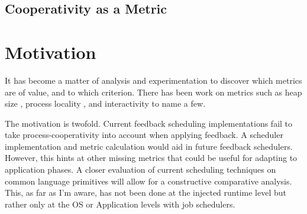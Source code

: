 
\subsection{Cooperativity as a Metric}







\section{Motivation}


It has become a matter of analysis and experimentation to discover which metrics are of value, and to which criterion.
There has been work on metrics such as heap size \cite{white2012automated}, process locality 
\cite{debattista2002cache,ritson2012multicore}, and interactivity \cite{reppy1993concurrent} to name a few.

The motivation is twofold. Current feedback scheduling implementations fail to take process-cooperativity
into account when applying feedback. A scheduler implementation and metric calculation would aid in future
feedback schedulers. However, this hints at other missing metrics that could be useful for adapting to
application phases. A closer evaluation of current scheduling techniques on common language primitives
will allow for a constructive comparative analysis. This, as far as I'm aware, has not been done at the 
injected runtime level but rather only at the OS or Application levels with job schedulers.

